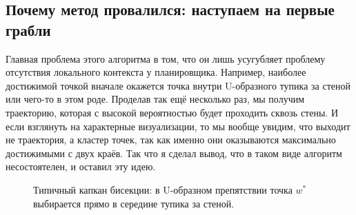 \subsection{Почему метод провалился: наступаем на первые грабли}

Главная проблема этого алгоритма в том, что он лишь усугубляет проблему отсутствия локального контекста у планировщика. Например, наиболее достижимой точкой вначале окажется точка внутри U-образного тупика за стеной или чего-то в этом роде. Проделав так ещё несколько раз, мы получим траекторию, которая с высокой вероятностью будет проходить сквозь стены. И если взглянуть на характерные визуализации, то мы вообще увидим, что выходит не траектория, а кластер точек, так как именно они оказываются максимально достижимыми с двух краёв. Так что я сделал вывод, что в таком виде алгоритм несостоятелен, и оставил эту идею.


\begin{figure}[t]
    \centering
    
    \caption{Типичный капкан бисекции: в U-образном препятствии точка $w^*$ выбирается прямо в середине тупика за стеной.}
    \label{fig:bisection_failure}
\end{figure}

